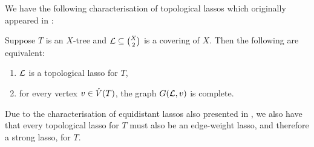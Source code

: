 We have the following characterisation of topological lassos which originally
appeared in \cite{huber13lassoing}:
\begin{thm}
  \label{thm:child-edge-graph-complete}
  Suppose $T$ is an $X$-tree and ${\mathcal L} \subseteq {X \choose 2}$ is a covering
  of $X$.  Then the following are equivalent:
  \begin{enumerate}
  \item ${\mathcal L}$ is a topological lasso for $T$,
  \item for every vertex $v \in \mathring{V}(T)$, the graph $G({\mathcal L},v)$ is complete.
  \end{enumerate}
\end{thm}

Due to the characterisation of equidistant lassos also presented in
\cite{huber13lassoing}, we also have that every topological lasso for $T$ must also be an
edge-weight lasso, and therefore a strong lasso, for $T$.

